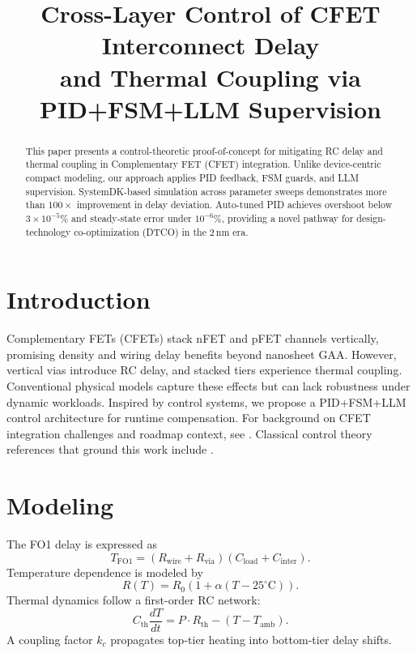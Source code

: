 \documentclass[conference]{IEEEtran}
\title{Cross-Layer Control of CFET Interconnect Delay\\
and Thermal Coupling via PID+FSM+LLM Supervision}
\author{
  \IEEEauthorblockN{Shinichi Samizo}
  \IEEEauthorblockA{Independent Semiconductor Researcher\\
  Email: \href{mailto:shin3t72@gmail.com}{shin3t72@gmail.com}}
}
\begin{document}
\maketitle

\begin{abstract}
This paper presents a control-theoretic proof-of-concept
for mitigating RC delay and thermal coupling in Complementary FET (CFET) integration.
Unlike device-centric compact modeling, our approach applies PID feedback, FSM guards,
and LLM supervision. SystemDK-based simulation across parameter sweeps demonstrates
more than $100\times$ improvement in delay deviation. Auto-tuned PID achieves overshoot
below $3\times 10^{-5}\%$ and steady-state error under $10^{-6}\%$, providing a novel pathway
for design-technology co-optimization (DTCO) in the 2\,nm era.
\end{abstract}

\section{Introduction}
Complementary FETs (CFETs) stack nFET and pFET channels vertically,
promising density and wiring delay benefits beyond nanosheet GAA.
However, vertical vias introduce RC delay, and stacked tiers experience
thermal coupling. Conventional physical models capture these effects
but can lack robustness under dynamic workloads. Inspired by control systems,
we propose a PID+FSM+LLM control architecture for runtime compensation.
For background on CFET integration challenges and roadmap context, see \cite{yakimets2020cfet,irds2023}.
Classical control theory references that ground this work include \cite{franklin2015feedback,khalil2002nonlinear,anderson2007optimal}.

\section{Modeling}
The FO1 delay is expressed as
\begin{equation}
T_{\mathrm{FO1}}=(R_{\mathrm{wire}}+R_{\mathrm{via}})(C_{\mathrm{load}}+C_{\mathrm{inter}}). \label{eq:fo1}
\end{equation}
Temperature dependence is modeled by
\begin{equation}
R(T)=R_0\!\left(1+\alpha (T-25^{\circ}\! \mathrm{C})\right). \label{eq:rtemp}
\end{equation}
Thermal dynamics follow a first-order RC network:
\begin{equation}
C_{\mathrm{th}}\frac{dT}{dt}=P\cdot R_{\mathrm{th}}-(T-T_{\mathrm{amb}}). \label{eq:therm}
\end{equation}
A coupling factor $k_c$ propagates top-tier heating into bottom-tier delay shifts.
\end{document}
